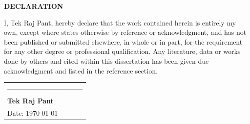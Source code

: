 




\begin{center}
	{\Large{\bf{DECLARATION}}}
\end{center}


\noindent
I, Tek Raj Pant, hereby declare that the work contained herein is entirely my own, except where states otherwise by reference or acknowledgment, and has not been published or submitted elsewhere, in whole or in part,  for the requirement for any other degree or professional qualification.  Any literature, data or works done by others and cited within this dissertation has been given due acknowledgment and listed in the reference section. 



\vspace{3cm}





	
\noindent
\hspace{10cm}
\begin{tabular}{l}
	---------------------------------\\
	{\bf{Tek Raj Pant}}\\
	Date: \today
\end{tabular}



